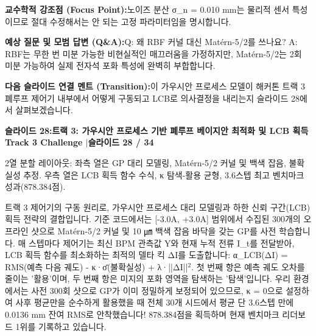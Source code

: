 \documentclass[11pt,a4paper]{article}
\begin{document}
\begin{tcolorbox}[colback=lightbg,colframe=bordergray,left=6pt,right=6pt,top=3pt,bottom=3pt,boxrule=0.6pt,arc=2.5pt]
\small
\noindent\textbf{\color{navy}교수학적 강조점 (Focus Point):}\enspace 노이즈 분산 σ\_n = 0.010 mm는 물리적 센서 특성이므로 절대 수정해서는 안 되는 고정 파라미터임을 명시합니다.\par\vspace{0.3em}
\noindent\textbf{\color{successgreen}예상 질문 및 모범 답변 (Q\&A):}\enspace Q: 왜 RBF 커널 대신 Matérn-5/2를 쓰나요? A: RBF는 무한 번 미분 가능한 비현실적인 매끄러움을 가정하지만, Matérn-5/2는 2회 미분 가능하여 실제 전자석 포화 특성에 완벽히 부합합니다.\par\vspace{0.3em}
\noindent\textbf{\color{accent}다음 슬라이드 연결 멘트 (Transition):}\enspace 이 가우시안 프로세스 모델이 해커톤 트랙 3 폐루프 제어기 내부에서 어떻게 구동되고 LCB로 의사결정을 내리는지 슬라이드 28에서 살펴보겠습니다.
\end{tcolorbox}
\clearpage
\hypertarget{slide.28}{}
{}
\noindent\begin{tcolorbox}[colback=navy,colframe=navy,left=6pt,right=6pt,top=3pt,bottom=3pt,boxrule=0pt,arc=2pt]
{\large\bfseries\color{white}슬라이드 28:\enspace 트랙 3: 가우시안 프로세스 기반 폐루프 베이지안 최적화 및 LCB 획득}\hfill{\footnotesize\bfseries\color{white!85!lightbg}Track 3 Challenge \enspace$|$\enspace 슬라이드 28 / 34}
\end{tcolorbox}
\vspace{0.2em}
\begin{tcolorbox}[colback=lightbg,colframe=bordergray,title={\footnotesize\bfseries\color{darkgray}슬라이드 시각 구성 요약},fontupper=\small,left=6pt,right=6pt,top=2.5pt,bottom=2.5pt,boxrule=0.6pt,arc=2.5pt]
2열 분할 레이아웃: 좌측 열은 GP 대리 모델링, Matérn-5/2 커널 및 백색 잡음, 불확실성 추정. 우측 열은 LCB 획득 함수 수식, κ 탐색-활용 균형, 3.6스텝 최고 벤치마크 성과(878.384점).
\end{tcolorbox}
\vspace{0.2em}
\begin{tcolorbox}[colback=white,colframe=primaryblue,title={\footnotesize\bfseries\color{white}발표자 구두 대본 (Spoken Script)},fontupper=\small,left=6pt,right=6pt,top=3pt,bottom=3pt,boxrule=0.8pt,arc=2.5pt]
트랙 3 제어기의 구동 원리로, 가우시안 프로세스 대리 모델링과 하한 신뢰 구간(LCB) 획득 전략의 결합입니다. 기준 코드에서는 [-3.0A, +3.0A] 범위에서 수집된 300개의 오프라인 샷으로 Matérn-5/2 커널 및 10 ㎛ 백색 잡음 바닥을 갖는 GP를 사전 학습합니다. 매 스텝마다 제어기는 최신 BPM 관측값 Y와 현재 누적 전류 I\_t를 전달받아, LCB 획득 함수를 최소화하는 최적의 델타 킥 ΔI를 도출합니다: α\_LCB(ΔI) = RMS(예측 다음 궤도) - κ·σ̄(불확실성) + λ·||ΔI||$^2$. 첫 번째 항은 예측 궤도 오차를 줄이는 '활용'이며, 두 번째 항은 미지의 포화 영역을 탐색하는 '탐색'입니다. 우리 환경에서는 사전 300회 샷으로 GP가 이미 정밀하게 보정되어 있으므로, κ = 0으로 설정하여 사후 평균만을 순수하게 활용했을 때 전체 30개 시드에서 평균 단 3.6스텝 만에 0.0136 mm 잔여 RMS로 안착했습니다! 878.384점을 획득하며 현재 벤치마크 리더보드 1위를 기록하고 있습니다.
\end{tcolorbox}
\end{document}

